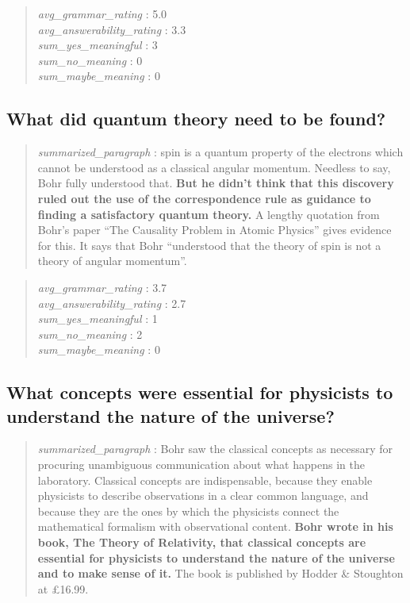 \begin{quote}
\emph{avg\_grammar\_rating} : 5.0\\
\emph{avg\_answerability\_rating} : 3.3\\
\emph{sum\_yes\_meaningful} : 3\\
\emph{sum\_no\_meaning} : 0\\
\emph{sum\_maybe\_meaning} : 0
\end{quote}

\hypertarget{what-did-quantum-theory-need-to-be-found}{%
\subsection{What did quantum theory need to be
found?}\label{what-did-quantum-theory-need-to-be-found}}

\begin{quote}
\emph{summarized\_paragraph} : spin is a quantum property of the
electrons which cannot be understood as a classical angular momentum.
Needless to say, Bohr fully understood that. \textbf{But he didn't think
that this discovery ruled out the use of the correspondence rule as
guidance to finding a satisfactory quantum theory.} A lengthy quotation
from Bohr's paper ``The Causality Problem in Atomic Physics'' gives
evidence for this. It says that Bohr ``understood that the theory of
spin is not a theory of angular momentum''.
\end{quote}

\begin{quote}
\emph{avg\_grammar\_rating} : 3.7\\
\emph{avg\_answerability\_rating} : 2.7\\
\emph{sum\_yes\_meaningful} : 1\\
\emph{sum\_no\_meaning} : 2\\
\emph{sum\_maybe\_meaning} : 0
\end{quote}

\hypertarget{what-concepts-were-essential-for-physicists-to-understand-the-nature-of-the-universe}{%
\subsection{What concepts were essential for physicists to understand
the nature of the
universe?}\label{what-concepts-were-essential-for-physicists-to-understand-the-nature-of-the-universe}}

\begin{quote}
\emph{summarized\_paragraph} : Bohr saw the classical concepts as
necessary for procuring unambiguous communication about what happens in
the laboratory. Classical concepts are indispensable, because they
enable physicists to describe observations in a clear common language,
and because they are the ones by which the physicists connect the
mathematical formalism with observational content. \textbf{Bohr wrote in
his book, The Theory of Relativity, that classical concepts are
essential for physicists to understand the nature of the universe and to
make sense of it.} The book is published by Hodder \& Stoughton at
£16.99.
\end{quote}

